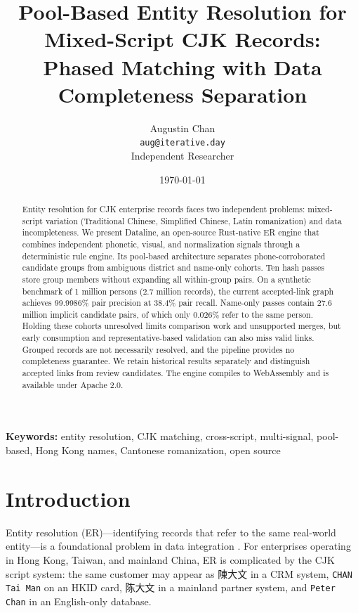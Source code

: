 \documentclass{article}
\title{Pool-Based Entity Resolution for Mixed-Script CJK Records:\\Phased Matching with Data Completeness Separation}
\author{Augustin Chan\\
\texttt{aug@iterative.day}\\
Independent Researcher}
\date{\today}
\begin{document}
\maketitle

\begin{abstract}
Entity resolution for CJK enterprise records faces two independent problems: mixed-script variation (Traditional Chinese, Simplified Chinese, Latin romanization) and data incompleteness. We present Dataline, an open-source Rust-native ER engine that combines independent phonetic, visual, and normalization signals through a deterministic rule engine. Its pool-based architecture separates phone-corroborated candidate groups from ambiguous district and name-only cohorts. Ten hash passes store group members without expanding all within-group pairs. On a synthetic benchmark of 1 million persons (2.7 million records), the current accepted-link graph achieves 99.9986\% pair precision at 38.4\% pair recall. Name-only passes contain 27.6 million implicit candidate pairs, of which only 0.026\% refer to the same person. Holding these cohorts unresolved limits comparison work and unsupported merges, but early consumption and representative-based validation can also miss valid links. Grouped records are not necessarily resolved, and the pipeline provides no completeness guarantee. We retain historical results separately and distinguish accepted links from review candidates. The engine compiles to WebAssembly and is available under Apache 2.0.
\end{abstract}

\textbf{Keywords:} entity resolution, CJK matching, cross-script, multi-signal, pool-based, Hong Kong names, Cantonese romanization, open source

\section{Introduction}\label{sec:introduction}

Entity resolution (ER)—identifying records that refer to the same real-world entity—is a foundational problem in data integration \cite{christophides2020overview}. For enterprises operating in Hong Kong, Taiwan, and mainland China, ER is complicated by the CJK script system: the same customer may appear as 陳大文 in a CRM system, \texttt{CHAN Tai Man} on an HKID card, 陈大文 in a mainland partner system, and \texttt{Peter Chan} in an English-only database.
\end{document}
